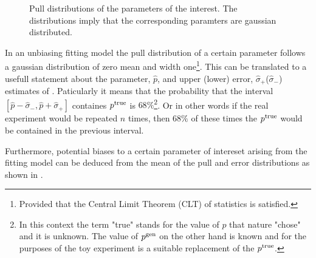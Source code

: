 \begin{figure}[h]
  \centering
  \begin{subfigure}{0.5\textwidth}
    \scalebox{0.60}{}
    \caption{}
    \label{pull_f0}
  \end{subfigure}%
  \hfill%
  \begin{subfigure}{0.5\textwidth}
    \scalebox{0.60}{}
    \caption{}
    \label{pull_fpar}
  \end{subfigure}
  \begin{subfigure}{0.5\textwidth}
    \scalebox{0.60}{}
    \caption{}
    \label{pull_AparPhase}
  \end{subfigure}%
  \hfill%
  \begin{subfigure}{0.5\textwidth}
    \scalebox{0.60}{}
    \caption{}
    \label{pull_AperpPhase}
  \end{subfigure}
\caption{Pull distributions of the parameters of the \pwave interest. The distributions imply that the corresponding paramters are gaussian distributed.}
\label{pull_pwave}
\end{figure}

In an unbiasing fitting model the pull distribution of a certain parameter follows a gaussian distribution of zero mean and width 
one\footnote{Provided that the Central Limit Theorem (CLT) of statistics is satisfied.}.
This can be translated to a usefull statement about the parameter, $\hat{p}$, and upper (lower) error, $\hat{\sigma}_+$($\hat{\sigma}_-$)
estimates of . Paticularly it means that the probability that the interval
$[\hat{p}-\hat{\sigma}_-,\hat{p}+\hat{\sigma}_+]$ containes $p^{\rm true}$ is $68\%$\footnote{In this context the term "true" stands for the 
value of $p$ that nature "chose" and it is unknown. The value of $p^{\rm gen}$ on the other hand is known and for the purposes of
the toy experiment is a suitable replacement of the $p^{\rm true}$.}. Or in other words if the real experiment would be repeated
$n$ times, then $68\%$ of these times the $p^{\rm true}$ would be contained in the previous interval. 

Furthermore, potential biases to a certain parameter of intereset arising from the fitting model 
can be deduced from the mean of the pull and error distributions as shown in .


